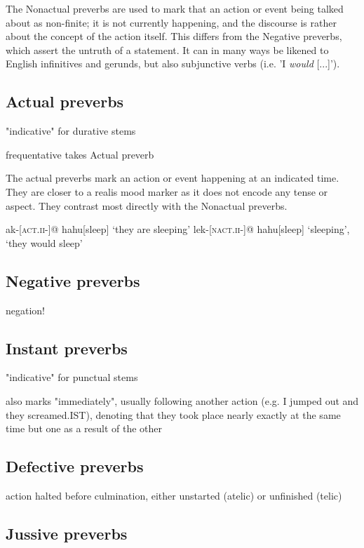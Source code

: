 \documentclass[smallroyalvopaper,9pt]{memoir}
\begin{document}
The Nonactual preverbs are used to mark that an action or event being talked about as non-finite; it is not currently happening, and the discourse is rather about the concept of the action itself. This differs from the Negative preverbs, which assert the untruth of a statement. It can in many ways be likened to English infinitives and gerunds, but also subjunctive verbs (i.e. 'I \textit{would} [...]'). 

\subsection{Actual preverbs}

"indicative" for durative stems

frequentative takes Actual preverb

The actual preverbs mark an action or event happening at an indicated time. They are closer to a realis mood marker as it does not encode any tense or aspect. They contrast most directly with the Nonactual preverbs.

\pex
\a\begingl
ak-[\textsc{act.ii}-]@
hahu[sleep]
\glft `they are sleeping'
\endgl
\a\begingl
lek-[\textsc{nact.ii}-]@
hahu[sleep]
\glft `sleeping', `they would sleep'
\endgl
\xe

\subsection{Negative preverbs}

negation!

\subsection{Instant preverbs}

"indicative" for punctual stems

also marks "immediately", usually following another action (e.g. I jumped out and they screamed.IST), denoting that they took place nearly exactly at the same time but one as a result of the other

\subsection{Defective preverbs}

action halted before culmination, either unstarted (atelic) or unfinished (telic)

\subsection{Jussive preverbs}
\end{document}
